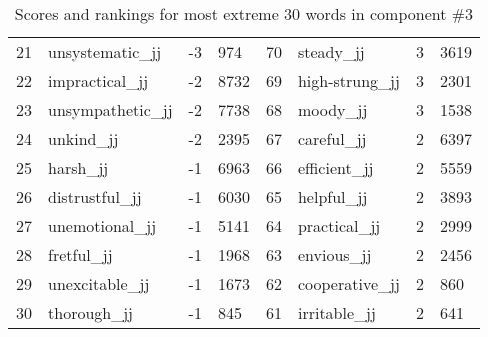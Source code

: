 \begin{table}[tbp]
\begin{tabular}{| rlr@{.}l | rlr@{.}l |}
    21 & unsystematic\_jj & -3 & 974    &    70 & steady\_jj & 3 & 3619 \\
    22 & impractical\_jj & -2 & 8732    &    69 & high-strung\_jj & 3 & 2301 \\
    23 & unsympathetic\_jj & -2 & 7738    &    68 & moody\_jj & 3 & 1538 \\
    24 & unkind\_jj & -2 & 2395    &    67 & careful\_jj & 2 & 6397 \\
    25 & harsh\_jj & -1 & 6963    &    66 & efficient\_jj & 2 & 5559 \\
    26 & distrustful\_jj & -1 & 6030    &    65 & helpful\_jj & 2 & 3893 \\
    27 & unemotional\_jj & -1 & 5141    &    64 & practical\_jj & 2 & 2999 \\
    28 & fretful\_jj & -1 & 1968    &    63 & envious\_jj & 2 & 2456 \\
    29 & unexcitable\_jj & -1 & 1673    &    62 & cooperative\_jj & 2 & 860 \\
    30 & thorough\_jj & -1 & 845    &    61 & irritable\_jj & 2 & 641 \\
    \hline
    \end{tabular}
    \caption{Scores and rankings for most extreme 30 words in component \#3} 
\end{table}
\clearpage

